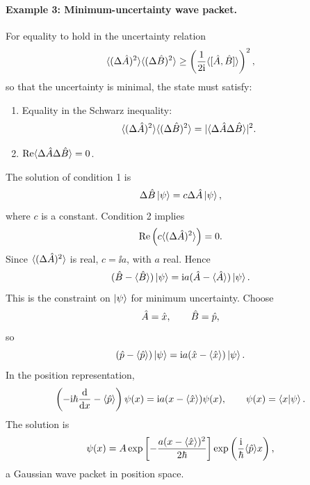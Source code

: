 \paragraph{Example 3: Minimum-uncertainty wave packet.}
For equality to hold in the uncertainty relation
\begin{equation}
\langle(\Delta\hat{A})^2\rangle\langle(\Delta\hat{B})^2\rangle
\ge\left(\frac1{2\mathrm{i}}\langle[\hat{A},\hat{B}]\rangle\right)^2,
\end{equation}
so that the uncertainty is minimal, the state must satisfy:
\begin{enumerate}[label=\arabic*)]
\item Equality in the Schwarz inequality:
\begin{equation}
\langle(\Delta\hat{A})^2\rangle\langle(\Delta\hat{B})^2\rangle
=|\langle\Delta\hat{A}\Delta\hat{B}\rangle|^2.
\end{equation}
\item $\operatorname{Re}\langle\Delta\hat{A}\Delta\hat{B}\rangle=0$.
\end{enumerate}
The solution of condition 1 is
\begin{equation}
\Delta\hat{B}\left|\psi\right\rangle=c\Delta\hat{A}\left|\psi\right\rangle,
\end{equation}
where $c$ is a constant. Condition 2 implies
\begin{equation}
\operatorname{Re}\left(c\langle(\Delta\hat{A})^2\rangle\right)=0.
\end{equation}
Since $\langle(\Delta\hat{A})^2\rangle$ is real, $c=\ii a$, with $a$ real. Hence
\begin{equation}
(\hat{B}-\langle\hat{B}\rangle)\left|\psi\right\rangle
=\mathrm{i} a(\hat{A}-\langle\hat{A}\rangle)\left|\psi\right\rangle.
\end{equation}
This is the constraint on $\left|\psi\right\rangle$ for minimum uncertainty. Choose
\begin{equation}
\hat{A}=\hat{x},\qquad\hat{B}=\hat{p},
\end{equation}
so
\begin{equation}
(\hat{p}-\langle\hat{p}\rangle)\left|\psi\right\rangle
=\mathrm{i} a(\hat{x}-\langle\hat{x}\rangle)\left|\psi\right\rangle.
\end{equation}
In the position representation,
\begin{equation}
\left(-\mathrm{i}\hbar\frac{\mathrm{d}}{\mathrm{d} x}-\langle\hat{p}\rangle\right)\psi(x)
=\mathrm{i} a(x-\langle\hat{x}\rangle)\psi(x),\qquad
\psi(x)=\left\langle x\middle|\psi\right\rangle.
\end{equation}
The solution is
\begin{equation}
\psi(x)=A\exp\left[-\frac{a(x-\langle\hat{x}\rangle)^2}{2\hbar}\right]
\exp\left(\frac{\mathrm{i}}\hbar\langle\hat{p}\rangle x\right),
\end{equation}
a Gaussian wave packet in position space.
